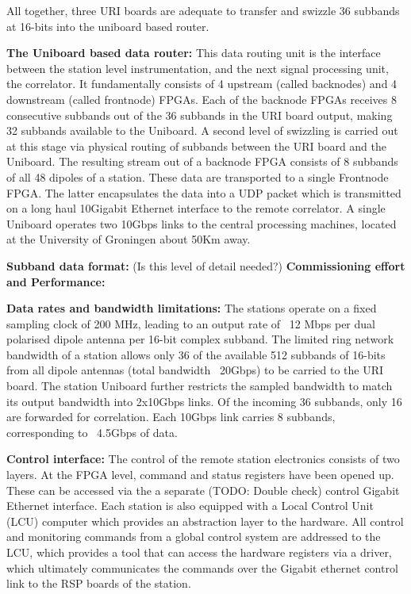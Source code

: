 \documentclass{aa}
\begin{document}
All together, three URI boards are  adequate to transfer and swizzle 36 subbands
at 16-bits into the uniboard based router.

\textbf  {The  Uniboard based  data  router:}  This  data  routing unit  is  the
interface  between  the  station  level instrumentation,  and  the  next  signal
processing unit, the correlator. It fundamentally consists of 4 upstream (called
backnodes) and 4 downstream (called frontnode) FPGAs. Each of the backnode FPGAs
receives 8 consecutive subbands out of the  36 subbands in the URI board output,
making 32  subbands available to  the Uniboard. A  second level of  swizzling is
carried out at this stage via physical routing of subbands between the URI board
and the  Uniboard. The  resulting stream out  of a backnode  FPGA consists  of 8
subbands of all 48 dipoles of a  station. These data are transported to a single
Frontnode FPGA.   The latter encapsulates  the data into  a UDP packet  which is
transmitted  on  a  long  haul   10Gigabit  Ethernet  interface  to  the  remote
correlator.  A  single  Uniboard  operates  two  10Gbps  links  to  the  central
processing machines, located at the University of Groningen about 50Km away.


\textbf  {Subband data  format:}  (Is this level of detail needed?)
\textbf {Commissioning effort and Performance:}

\textbf {Data rates and bandwidth limitations: } The stations operate on a fixed
sampling  clock of  200 MHz,  leading to  an output  rate of  ~12 Mbps  per dual
polarised dipole  antenna per 16-bit  complex subband. The limited  ring network
bandwidth of a station  allows only 36 of the available  512 subbands of 16-bits
from all  dipole antennas  (total bandwidth  ~20Gbps) to be  carried to  the URI
board.  The  station Uniboard further  restricts the sampled bandwidth  to match
its output bandwidth into 2x10Gbps links.   Of the incoming 36 subbands, only 16
are  forwarded   for  correlation.   Each  10Gbps   link  carries   8  subbands,
corresponding to ~4.5Gbps of data.


\textbf  {Control interface:}  The  control of  the  remote station  electronics
consists of  two layers. At  the FPGA level,  command and status  registers have
been opened up.  These can be accessed  via the a separate  (TODO: Double check)
control Gigabit Ethernet  interface. Each station is also equipped  with a Local
Control  Unit  (LCU)  computer  which  provides  an  abstraction  layer  to  the
hardware. All control  and monitoring commands from a global  control system are
addressed  to the  LCU,  which provides  a  tool that  can  access the  hardware
registers  via a  driver, which  ultimately communicates  the commands  over the
Gigabit ethernet control link to the RSP boards of the station.
\end{document}

